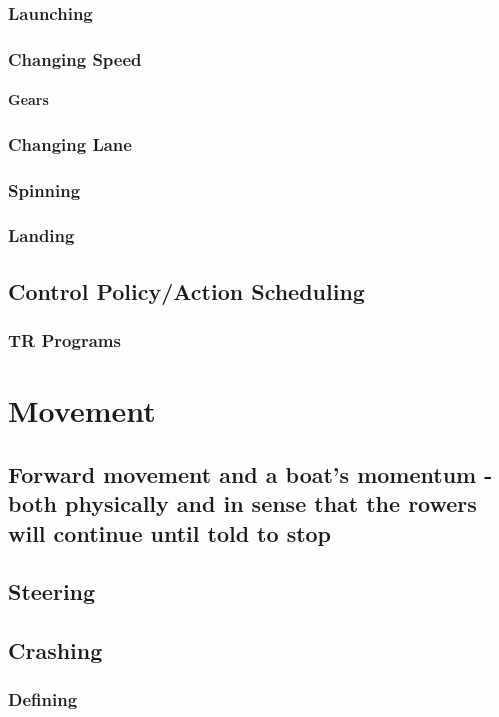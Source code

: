       \subsubsection{Launching}
      \subsubsection{Changing Speed}
        \paragraph{Gears}
      \subsubsection{Changing Lane}
      \subsubsection{Spinning}
      \subsubsection{Landing}
    
    \subsection{Control Policy/Action Scheduling}
      \subsubsection{TR Programs}
    
  \section{Movement}
    \subsection{Forward movement and a boat's momentum - both physically and in sense that the rowers will continue until told to stop}
    \subsection{Steering}
    \subsection{Crashing}
      \subsubsection{Defining}
